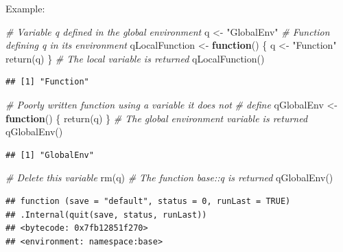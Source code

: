 \documentclass[
  12pt,
  american,
  a4paper,
  extrafontsizes,onecolumn,openright
  ]{memoir}
\newenvironment{Shaded}{\begin{snugshade}}{\end{snugshade}}
\newcommand{\CommentTok}[1]{\textcolor[rgb]{0.56,0.35,0.01}{\textit{#1}}}
\newcommand{\ControlFlowTok}[1]{\textcolor[rgb]{0.13,0.29,0.53}{\textbf{#1}}}
\newcommand{\FunctionTok}[1]{\textcolor[rgb]{0.00,0.00,0.00}{#1}}
\newcommand{\NormalTok}[1]{#1}
\newcommand{\OtherTok}[1]{\textcolor[rgb]{0.56,0.35,0.01}{#1}}
\newcommand{\StringTok}[1]{\textcolor[rgb]{0.31,0.60,0.02}{#1}}
\begin{document}
Example:

\scriptsize

\begin{Shaded}
\begin{Highlighting}[]
\CommentTok{\# Variable q defined in the global environment}
\NormalTok{q }\OtherTok{\textless{}{-}} \StringTok{"GlobalEnv"}
\CommentTok{\# Function defining q in its environment}
\NormalTok{qLocalFunction }\OtherTok{\textless{}{-}} \ControlFlowTok{function}\NormalTok{() \{}
\NormalTok{    q }\OtherTok{\textless{}{-}} \StringTok{"Function"}
    \FunctionTok{return}\NormalTok{(q)}
\NormalTok{\}}
\CommentTok{\# The local variable is returned}
\FunctionTok{qLocalFunction}\NormalTok{()}
\end{Highlighting}
\end{Shaded}

\begin{verbatim}
## [1] "Function"
\end{verbatim}

\begin{Shaded}
\begin{Highlighting}[]
\CommentTok{\# Poorly written function using a variable it does not}
\CommentTok{\# define}
\NormalTok{qGlobalEnv }\OtherTok{\textless{}{-}} \ControlFlowTok{function}\NormalTok{() \{}
    \FunctionTok{return}\NormalTok{(q)}
\NormalTok{\}}
\CommentTok{\# The global environment variable is returned}
\FunctionTok{qGlobalEnv}\NormalTok{()}
\end{Highlighting}
\end{Shaded}

\begin{verbatim}
## [1] "GlobalEnv"
\end{verbatim}

\begin{Shaded}
\begin{Highlighting}[]
\CommentTok{\# Delete this variable}
\FunctionTok{rm}\NormalTok{(q)}
\CommentTok{\# The function base::q is returned}
\FunctionTok{qGlobalEnv}\NormalTok{()}
\end{Highlighting}
\end{Shaded}

\begin{verbatim}
## function (save = "default", status = 0, runLast = TRUE) 
## .Internal(quit(save, status, runLast))
## <bytecode: 0x7fb12851f270>
## <environment: namespace:base>
\end{verbatim}

\normalsize
\end{document}
